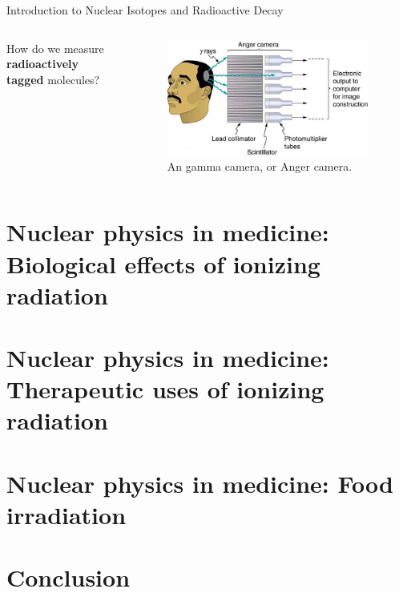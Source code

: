 \documentclass{beamer}
\begin{document}
\begin{frame}{Introduction to Nuclear Isotopes and Radioactive Decay}
\begin{columns}[T]
\begin{column}{0.5\textwidth}
\small
How do we measure \textbf{\alert{radioactively tagged}} molecules?
\end{column}
\begin{column}{0.5\textwidth}
\begin{figure}
\centering
\includegraphics[width=0.95\textwidth]{figures/anger_camera.png}
\caption{\label{fig:medicine_1} An gamma camera, or Anger camera.}
\end{figure}
\end{column}
\end{columns}
\end{frame}

\section{Nuclear physics in medicine: Biological effects of ionizing radiation}

\section{Nuclear physics in medicine: Therapeutic uses of ionizing radiation}

\section{Nuclear physics in medicine: Food irradiation}

\section{Conclusion}
\end{document}
